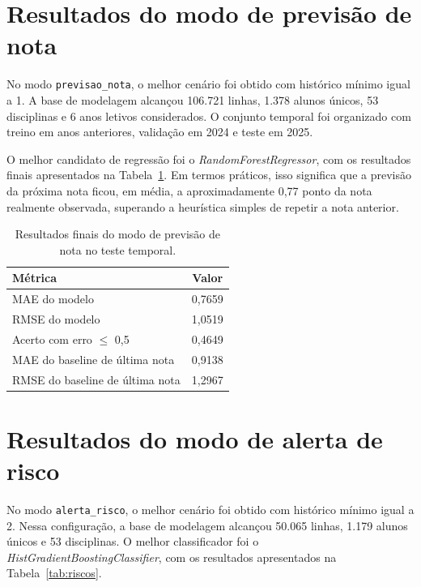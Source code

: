 \section{Resultados do modo de previs\~ao de nota}
\label{sec:prev-nota}

No modo \texttt{previsao\_nota}, o melhor cen\'ario foi obtido com hist\'orico m\'inimo igual a 1. A base de modelagem alcan\c{c}ou 106.721 linhas, 1.378 alunos \'unicos, 53 disciplinas e 6 anos letivos considerados. O conjunto temporal foi organizado com treino em anos anteriores, valida\c{c}\~ao em 2024 e teste em 2025.

O melhor candidato de regress\~ao foi o \textit{RandomForestRegressor}, com os resultados finais apresentados na Tabela~\ref{tab:prevnota}. Em termos pr\'aticos, isso significa que a previs\~ao da pr\'oxima nota ficou, em m\'edia, a aproximadamente 0,77 ponto da nota realmente observada, superando a heur\'istica simples de repetir a nota anterior.

\begin{table}[ht]
\caption{Resultados finais do modo de previs\~ao de nota no teste temporal.}
\label{tab:prevnota}
\centering
\begin{tabular}{l c}
\hline
\textbf{M\'etrica} & \textbf{Valor} \\
\hline
MAE do modelo & 0,7659 \\
RMSE do modelo & 1,0519 \\
Acerto com erro $\leq$ 0,5 & 0,4649 \\
MAE do baseline de \'ultima nota & 0,9138 \\
RMSE do baseline de \'ultima nota & 1,2967 \\
\hline
\end{tabular}
\end{table}

\section{Resultados do modo de alerta de risco}
\label{sec:alerta-risco}

No modo \texttt{alerta\_risco}, o melhor cen\'ario foi obtido com hist\'orico m\'inimo igual a 2. Nessa configura\c{c}\~ao, a base de modelagem alcan\c{c}ou 50.065 linhas, 1.179 alunos \'unicos e 53 disciplinas. O melhor classificador foi o \textit{HistGradientBoostingClassifier}, com os resultados apresentados na Tabela~\ref{tab:riscos}.

